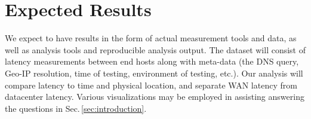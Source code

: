\section{Expected Results}
\label{sec:results}

We expect to have results in the form of actual measurement tools and data, as well as analysis tools and reproducible analysis output. The dataset will consist of latency measurements between end hosts along with meta-data (the DNS query, Geo-IP resolution, time of testing, environment of testing, etc.). Our analysis will compare latency to time and physical location, and separate WAN latency from datacenter latency. Various visualizations may be employed in assisting answering the questions in Sec.\,\ref{sec:introduction}.

